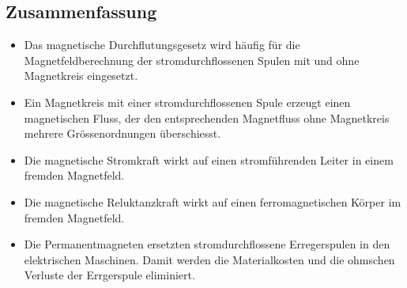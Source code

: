 \subsection{Zusammenfassung}

\begin{itemize}
\item Das magnetische Durchflutungsgesetz wird häufig für die Magnetfeldberechnung der stromdurchflossenen Spulen mit und ohne Magnetkreis eingesetzt. 
\item Ein Magnetkreis mit einer stromdurchflossenen Spule erzeugt einen magnetischen Fluss, der den entsprechenden Magnetfluss ohne Magnetkreis mehrere Grössenordnungen überschiesst.
\item Die magnetische Stromkraft wirkt auf einen stromführenden Leiter in einem fremden Magnetfeld.
\item Die magnetische Reluktanzkraft wirkt auf einen ferromagnetischen Körper im fremden Magnetfeld.
\item Die Permanentmagneten ersetzten stromdurchflossene Erregerspulen in den elektrischen Maschinen. Damit werden die Materialkosten und die ohmschen Verluste der Errgerspule eliminiert.
\end{itemize}